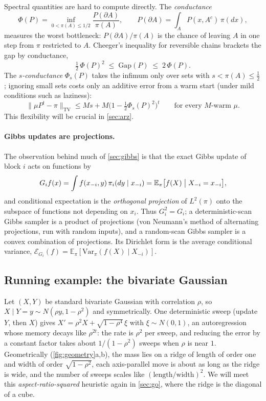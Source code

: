 \documentclass[11pt]{article}
\theoremstyle{remark}
\newcommand{\TV}{\mathrm{TV}}
\newcommand{\Gap}{\mathrm{Gap}}
\newcommand{\E}{\mathbb{E}}
\begin{document}
Spectral quantities are hard to compute directly. The \emph{conductance}
\[
\Phi(P)=\inf_{0<\pi(A)\le1/2}\frac{P(\partial A)}{\pi(A)},\qquad P(\partial A)=\int_A P(x,A^c)\,\pi(dx),
\]
measures the worst bottleneck: $P(\partial A)/\pi(A)$ is the chance of leaving $A$ in one step from $\pi$ restricted to $A$. Cheeger's inequality for reversible chains \citep{lawler1988,sinclair1989} brackets the gap by conductance,
\begin{equation}\label{eq:cheeger}
\tfrac12\,\Phi(P)^2\;\le\;\Gap(P)\;\le\;2\,\Phi(P).
\end{equation}
The \emph{$s$-conductance} $\Phi_s(P)$ takes the infimum only over sets with $s<\pi(A)\le\frac12$ \citep{lovasz1993random}; ignoring small sets costs only an additive error from a warm start (under mild conditions such as laziness):
\begin{equation}\label{eq:sconductance}
\|\mu P^t-\pi\|_\TV\le Ms+M\bigl(1-\tfrac12\Phi_s(P)^2\bigr)^t\qquad\text{for every $M$-warm }\mu.
\end{equation}
This flexibility will be crucial in \cref{sec:arz}.

\paragraph{Gibbs updates are projections.} The observation behind much of \cref{sec:gibbs} is that the exact Gibbs update of block $i$ acts on functions by
\[
G_if(x)=\int f(x_{-i},y)\,\pi_i(dy\mid x_{-i})=\E_\pi\bigl[f(X)\bigm| X_{-i}=x_{-i}\bigr],
\]
and conditional expectation is the \emph{orthogonal projection} of $L^2(\pi)$ onto the subspace of functions not depending on $x_i$. Thus $G_i^2=G_i$; a deterministic-scan Gibbs sampler is a product of projections (von Neumann's method of alternating projections, run with random inputs), and a random-scan Gibbs sampler is a convex combination of projections. Its Dirichlet form is the average conditional variance, $\mathcal E_{G_i}(f)=\E_\pi[\mathrm{Var}_\pi(f(X)\mid X_{-i})]$.

\subsection{Running example: the bivariate Gaussian}\label{sec:running}
Let $(X,Y)$ be standard bivariate Gaussian with correlation $\rho$, so $X\mid Y=y\sim N(\rho y,1-\rho^2)$ and symmetrically. One deterministic sweep (update $Y$, then $X$) gives $X'=\rho^2X+\sqrt{1-\rho^4}\,\xi$ with $\xi\sim N(0,1)$, an autoregression whose memory decays like $\rho^{2t}$: the rate is $\rho^2$ per sweep, and reducing the error by a constant factor takes about $1/(1-\rho^2)$ sweeps when $\rho$ is near $1$. Geometrically (\cref{fig:geometry}a,b), the mass lies on a ridge of length of order one and width of order $\sqrt{1-\rho^2}$, each axis-parallel move is about as long as the ridge is wide, and the number of sweeps scales like $(\text{length}/\text{width})^2$. We will meet this \emph{aspect-ratio-squared} heuristic again in \cref{sec:go}, where the ridge is the diagonal of a cube.
\end{document}
